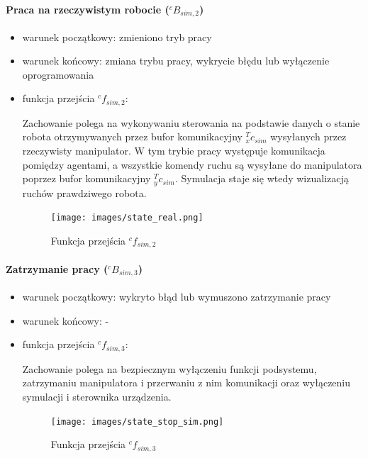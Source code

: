 \documentclass[a4paper, 12pt, twoside]{article}
\begin{document}
\paragraph{Praca na rzeczywistym robocie ($^cB_{sim,2}$)}

\begin{itemize}
\item warunek początkowy: zmieniono tryb pracy
\item warunek końcowy: zmiana trybu pracy, wykrycie błędu lub wyłączenie oprogramowania
\item funkcja przejścia $^cf_{sim,2}$:

Zachowanie polega na wykonywaniu sterowania na podstawie danych o stanie robota otrzymywanych przez bufor komunikacyjny $^T_xc_{sim}$ wysyłanych przez rzeczywisty manipulator. W tym trybie pracy występuje komunikacja pomiędzy agentami, a wszystkie komendy ruchu są wysyłane do manipulatora poprzez bufor komunikacyjny $^T_yc_{sim}$. Symulacja staje się wtedy  wizualizacją ruchów prawdziwego robota.

\begin{figure}[hbt!]
\centering
\texttt{[image: images/state\_real.png]}
\caption{Funkcja przejścia $^cf_{sim,2}$ }
\label{fig:state_real}
\end{figure}

\end{itemize}

\newpage
\paragraph{Zatrzymanie pracy ($^cB_{sim,3}$)}

\begin{itemize}
\item warunek początkowy: wykryto błąd lub wymuszono zatrzymanie pracy
\item warunek końcowy: -
\item funkcja przejścia $^cf_{sim,3}$:

Zachowanie polega na bezpiecznym wyłączeniu funkcji podsystemu, zatrzymaniu manipulatora i przerwaniu z nim komunikacji oraz wyłączeniu symulacji i sterownika urządzenia.

\begin{figure}[hbt!]
\centering
\texttt{[image: images/state\_stop\_sim.png]}
\caption{Funkcja przejścia $^cf_{sim,3}$ }
\label{fig:state_stop_sim}
\end{figure}

\end{itemize}
\end{document}
